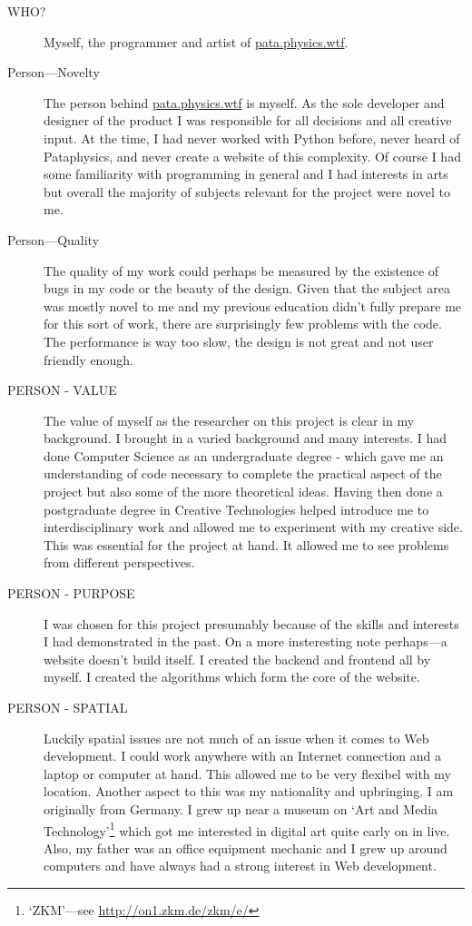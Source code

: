 \begin{description}
  \item[WHO?] Myself, the programmer and artist of \url{pata.physics.wtf}.
  \item[Person---Novelty] The person behind \url{pata.physics.wtf} is myself. As the sole developer and designer of the product I was responsible for all decisions and all creative input. At the time, I had never worked with Python before, never heard of Pataphysics, and never create a website of this complexity. Of course I had some familiarity with programming in general and I had interests in arts but overall the majority of subjects relevant for the project were novel to me.
  \item[Person---Quality] The quality of my work could perhaps be measured by the existence of bugs in my code or the beauty of the design. Given that the subject area was mostly novel to me and my previous education didn't fully prepare me for this sort of work, there are surprisingly few problems with the code.  The performance is way too slow, the design is not great and not user friendly enough.
  \item[PERSON - VALUE] The value of myself as the researcher on this project is clear in my background. I brought in a varied background and many interests. I had done Computer Science as an undergraduate degree - which gave me an understanding of code necessary to complete the practical aspect of the project but also some of the more theoretical ideas. Having then done a postgraduate degree in Creative Technologies helped introduce me to interdisciplinary work and allowed me to experiment with my creative side. This was essential for the project at hand. It allowed me to see problems from different perspectives.
  \item[PERSON - PURPOSE] I was chosen for this project presumably because of the skills and interests I had demonstrated in the past. On a more insteresting note perhaps---a website doesn't build itself. I created the backend and frontend all by myself. I created the algorithms which form the core of the website.
  \item[PERSON - SPATIAL] Luckily spatial issues are not much of an issue when it comes to Web development. I could work anywhere with an Internet connection and a laptop or computer at hand. This allowed me to be very flexibel with my location. Another aspect to this was my nationality and upbringing. I am originally from Germany. I grew up near a museum on `Art and Media Technology'\footnote{`ZKM'---see \url{http://on1.zkm.de/zkm/e/}} which got me interested in digital art quite early on in live. Also, my father was an office equipment mechanic and I grew up around computers and have always had a strong interest in Web development.

\end{description}
